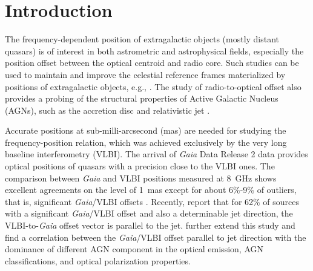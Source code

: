 \documentclass[referee]{aa}        %
\begin{document}

\maketitle


\section{Introduction}     \label{sec:introduction}

   The frequency-dependent position of extragalactic objects (mostly distant quasars) is of interest in both astrometric and astrophysical fields, especially the position offset between the optical centroid and radio core.
   Such studies can be used to maintain and improve the celestial reference frames materialized by positions of extragalactic objects, e.g., \citet{2010A&A...510A..10A,2011A&A...532A.115C,2013MNRAS.430.2797A,2014JGeod..88..575S}.
   The study of radio-to-optical offset also provides a probing of the structural properties of Active Galactic Nucleus (AGNs), such as the accretion disc and relativistic jet \citep[e.g.,][]{2013A&A...553A..13O,2019ApJ...871..143P}.

   Accurate positions at sub-milli-arcsecond (mas) are needed for studying the frequency-position relation, which was achieved exclusively by the very long baseline interferometry (VLBI).
   The arrival of \textit{Gaia} Data Release 2 \citep[\textit{Gaia} DR2;][]{2016A&A...595A...1G,2018A&A...616A...1G} data provides optical positions of quasars with a precision close to the VLBI ones.
   The comparison between \textit{Gaia} and VLBI positions measured at 8~GHz shows excellent agreements on the level of 1~mas except for about 6\%-9\% of outliers, that is, significant \textit{Gaia}/VLBI offsets \citep{2016A&A...595A...5M,2018A&A...616A..14G,2017MNRAS.471.3775P,2017MNRAS.467L..71P,2017A&A...598L...1K,2017ApJ...835L..30M,2018AJ....155..229F,2019MNRAS.482.3023P,2019ApJ...871..143P,2020MNRAS.493L..54K}.
   Recently, \citet{2019MNRAS.482.3023P} report that for 62\% of sources with a significant \textit{Gaia}/VLBI offset and also a determinable jet direction, the VLBI-to-\textit{Gaia} offset vector is parallel to the jet.
   \citet{2019ApJ...871..143P,2020MNRAS.493L..54K} further extend this study and find a correlation between the \textit{Gaia}/VLBI offset parallel to jet direction with the dominance of different AGN component in the optical emission, AGN classifications, and optical polarization properties.
\end{document}
